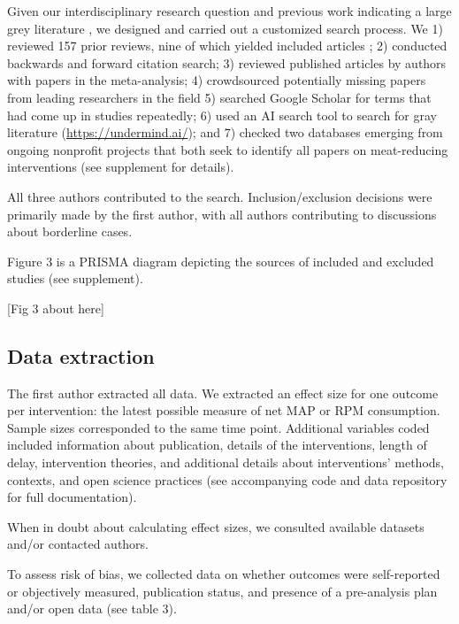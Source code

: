 \documentclass[sn-nature,referee,pdflatex]{sn-jnl}
\begin{document}
Given our interdisciplinary research question and previous work
indicating a large grey literature \citep{mathur2021meta}, we designed
and carried out a customized search process. We 1) reviewed 157 prior
reviews, nine of which yielded included articles
\citep{mathur2021meta, bianchi2018conscious, bianchi2018restructuring, ammann2023, chang2023, DiGennaro2024, harguess2020, ronto2022, wynes2018};
2) conducted backwards and forward citation search; 3) reviewed
published articles by authors with papers in the meta-analysis; 4)
crowdsourced potentially missing papers from leading researchers in the
field 5) searched Google Scholar for terms that had come up in studies
repeatedly; 6) used an AI search tool to search for gray literature
(\url{https://undermind.ai/}); and 7) checked two databases emerging
from ongoing nonprofit projects that both seek to identify all papers on
meat-reducing interventions (see supplement for details).

All three authors contributed to the search. Inclusion/exclusion
decisions were primarily made by the first author, with all authors
contributing to discussions about borderline cases.

Figure 3 is a PRISMA diagram depicting the sources of included and
excluded studies (see supplement).

\begin{center}
[Fig 3 about here]
\end{center}

\subsection{Data extraction}\label{sec3.3}

The first author extracted all data. We extracted an effect size for one
outcome per intervention: the latest possible measure of net MAP or RPM
consumption. Sample sizes corresponded to the same time point.
Additional variables coded included information about publication,
details of the interventions, length of delay, intervention theories,
and additional details about interventions' methods, contexts, and open
science practices (see accompanying code and data repository for full
documentation).

When in doubt about calculating effect sizes, we consulted available
datasets and/or contacted authors.

To assess risk of bias, we collected data on whether outcomes were
self-reported or objectively measured, publication status, and presence
of a pre-analysis plan and/or open data (see table 3).
\end{document}
